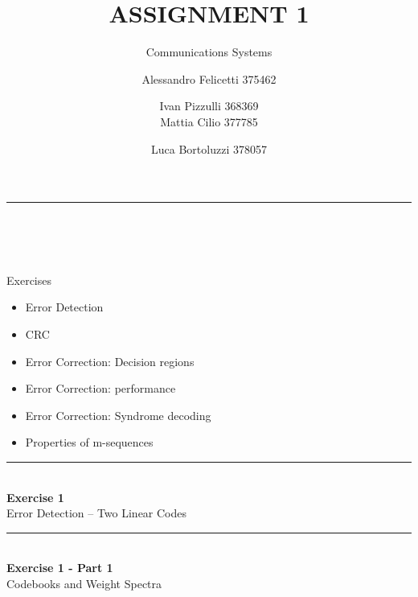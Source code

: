 \documentclass[10pt, aspectratio=169]{beamer}
\title{ASSIGNMENT 1}
\subtitle{Communications Systems}
\author{Alessandro Felicetti 375462 \and Ivan Pizzulli 368369 \\ Mattia Cilio 377785 \and Luca Bortoluzzi 378057}
\date{}
\begin{document}
\begin{frame}[plain]
  \vspace{1.0cm}
  \begin{flushleft}
    {\color{TealAccent}\rule{2.5cm}{2pt}}\\[0.5cm]
    {\inserttitle}\\[0.2cm]
    {\insertsubtitle}\\[1.0cm]
    {\insertauthor}
  \end{flushleft}
\end{frame}

\begin{frame}{Exercises}
  \begin{itemize}
    \item Error Detection
    \item CRC
    \item Error Correction: Decision regions
    \item Error Correction: performance
    \item Error Correction: Syndrome decoding
    \item Properties of m-sequences
  \end{itemize}
\end{frame}

\begin{frame}[plain]
  \vfill
  \centering
  {\color{TealAccent}\rule{2cm}{2pt}}\\[0.4cm]
  {\LARGE\bfseries\color{NavyPrimary} Exercise 1}\\[0.2cm]
  {\large\color{SlateNeutral} Error Detection -- Two Linear Codes}
  \vfill
\end{frame}

\begin{frame}[plain]
  \vfill
  \centering
  {\color{TealAccent}\rule{2cm}{2pt}}\\[0.4cm]
  {\LARGE\bfseries\color{NavyPrimary} Exercise 1 - Part 1}\\[0.2cm]
  {\large\color{SlateNeutral} Codebooks and Weight Spectra}
  \vfill
\end{frame}
\end{document}
